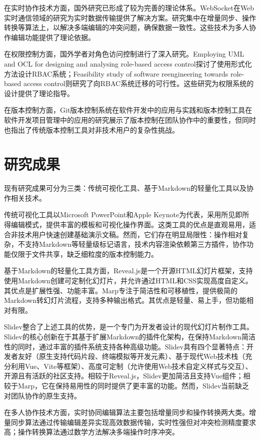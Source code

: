 在实时协作技术方面，国外研究已形成了较为完善的理论体系。WebSocket在Web实时通信领域的研究\cite{DNZS201028018}为实时数据传输提供了解决方案。研究集中在增量同步、操作转换等算法上，以解决多端编辑的冲突问题，确保数据一致性。这些技术为多人协作编辑功能提供了理论依据。

在权限控制方面，国外学者对角色访问控制进行了深入研究。Employing UML and OCL for designing and analysing role-based access control\cite{kuhlmann2013uml}探讨了使用形式化方法设计RBAC系统；Feasibility study of software reengineering towards role-based access control\cite{li2011reengineering}则研究了向RBAC系统迁移的可行性。这些研究为权限系统的设计提供了理论指导。

在版本控制方面，Git版本控制系统在软件开发中的应用与实践\cite{SXDS202505026}和版本控制工具在软件开发项目管理中的应用\cite{XMGJ202006028}的研究展示了版本控制在团队协作中的重要性，但同时也指出了传统版本控制工具对非技术用户的复杂性挑战。

\section{研究成果}
现有研究成果可分为三类：传统可视化工具、基于Markdown的轻量化工具以及协作相关技术。

传统可视化工具以Microsoft PowerPoint和Apple Keynote为代表，采用所见即所得编辑模式，提供丰富的模板和可视化操作界面。这类工具的优点是直观易用，适合非技术用户快速创建基础演示文稿。然而，它们存在明显局限性：操作相对复杂，不支持Markdown等轻量级标记语言，技术内容渲染依赖第三方插件，协作功能仅限于文件共享，缺乏细粒度的版本控制能力。

基于Markdown的轻量化工具方面，Reveal.js是一个开源HTML幻灯片框架，支持使用Markdown创建可定制化幻灯片，并允许通过HTML和CSS实现高度自定义。其优点是扩展性强、功能丰富。Marp专注于简洁性和可移植性，提供极简的Markdown转幻灯片流程，支持多种输出格式。其优点是轻量、易上手，但功能相对有限。

Slidev整合了上述工具的优势，是一个专门为开发者设计的现代幻灯片制作工具。Slidev的核心创新在于其基于扩展Markdown的插件化架构，在保持Markdown简洁性的同时，通过丰富的插件系统支持各种高级功能。Slidev具有四个显著特点：开发者友好（原生支持代码片段、终端模拟等开发元素）、基于现代Web技术栈（充分利用Vue、Vite等框架）、高度可定制（允许使用Web技术自定义样式与交互）、开源且有活跃的社区支持。相较于Reveal.js，Slidev更加简洁且支持Vue组件；相较于Marp，它在保持易用性的同时提供了更丰富的功能。然而，Slidev当前缺乏对团队协作的原生支持。

在多人协作技术方面，实时协同编辑算法主要包括增量同步和操作转换两大类。增量同步算法通过传输编辑差异实现高效数据传输，实时性强但对冲突检测精度要求高；操作转换算法通过数学方法解决多端操作时序冲突。

